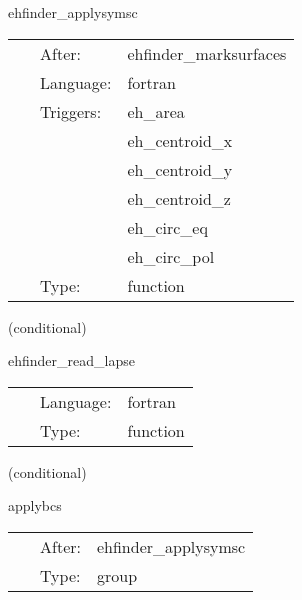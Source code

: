 \hspace{5mm} ehfinder\_applysymsc 

\hspace{5mm}{\it select the surface counter grid function for boundary conditions } 


\hspace{5mm}

 \begin{tabular*}{160mm}{cll} 
~ & After:  & ehfinder\_marksurfaces \\ 
~ & Language:  & fortran \\ 
~ & Triggers:  & eh\_area \\ 
~& ~ &eh\_centroid\_x\\ 
~& ~ &eh\_centroid\_y\\ 
~& ~ &eh\_centroid\_z\\ 
~& ~ &eh\_circ\_eq\\ 
~& ~ &eh\_circ\_pol\\ 
~ & Type:  & function \\ 
\end{tabular*} 


\vspace{5mm}

   (conditional) 

\hspace{5mm} ehfinder\_read\_lapse 

\hspace{5mm}{\it read in lapse from file } 


\hspace{5mm}

 \begin{tabular*}{160mm}{cll} 
~ & Language:  & fortran \\ 
~ & Type:  & function \\ 
\end{tabular*} 


\vspace{5mm}

   (conditional) 

\hspace{5mm} applybcs 

\hspace{5mm}{\it apply boundary conditions (symmetries) } 


\hspace{5mm}

 \begin{tabular*}{160mm}{cll} 
~ & After:  & ehfinder\_applysymsc \\ 
~ & Type:  & group \\ 
\end{tabular*} 


